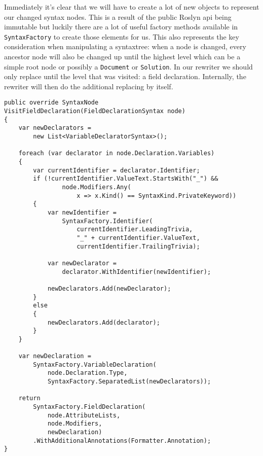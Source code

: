 Immediately it's clear that we will have to create a lot of new objects to represent our changed syntax nodes. This is a result of the public Roslyn \gls{api} being \gls{immutable} but luckily there are a lot of useful factory methods available in \texttt{SyntaxFactory} to create those elements for us. This also represents the key consideration when manipulating a \gls{syntaxtree}: when a node is changed, every ancestor node will also be changed up until the highest level which can be a simple root node or possibly a \texttt{Document} or \texttt{Solution}. In our rewriter we should only replace until the level that was visited: a field declaration. Internally, the rewriter will then do the additional replacing by itself.

\begin{lstlisting}[label={lst:syntaxrewriter-implementing-syntaxrewriter}]
public override SyntaxNode VisitFieldDeclaration(FieldDeclarationSyntax node)
{
	var newDeclarators = 
		new List<VariableDeclaratorSyntax>();

	foreach (var declarator in node.Declaration.Variables)
	{
		var currentIdentifier = declarator.Identifier;
		if (!currentIdentifier.ValueText.StartsWith("_") && 
				node.Modifiers.Any(
					x => x.Kind() == SyntaxKind.PrivateKeyword))
		{
			var newIdentifier = 
				SyntaxFactory.Identifier(
					currentIdentifier.LeadingTrivia, 
					"_" + currentIdentifier.ValueText, 
					currentIdentifier.TrailingTrivia);
					
			var newDeclarator = 
				declarator.WithIdentifier(newIdentifier);
				
			newDeclarators.Add(newDeclarator);
		}
		else
		{
			newDeclarators.Add(declarator);
		}
	}
	
	var newDeclaration = 
		SyntaxFactory.VariableDeclaration(
			node.Declaration.Type, 
			SyntaxFactory.SeparatedList(newDeclarators));
			
	return 
		SyntaxFactory.FieldDeclaration(
			node.AttributeLists, 
			node.Modifiers, 
			newDeclaration)
		.WithAdditionalAnnotations(Formatter.Annotation);
}
\end{lstlisting}

